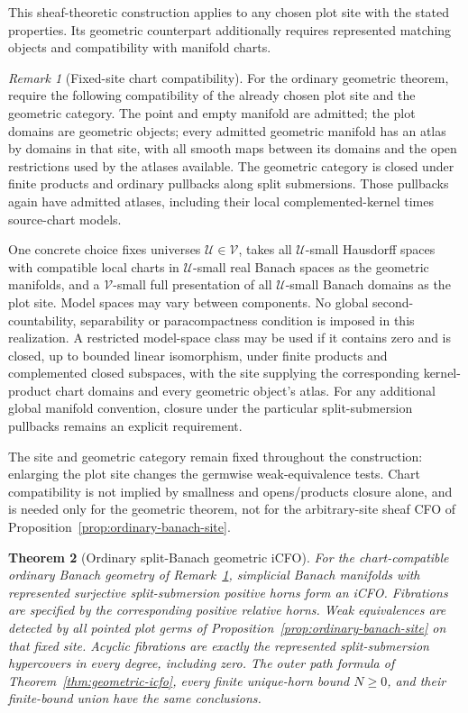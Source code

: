 \documentclass[12pt]{amsart}
\newtheorem{thm}{Theorem}[section]
\theoremstyle{definition}
\theoremstyle{remark}
\newtheorem{rem}[thm]{Remark}
\numberwithin{equation}{section}
\begin{document}
This sheaf-theoretic construction applies to any chosen
plot site with the stated properties. Its geometric
counterpart additionally requires represented matching
objects and compatibility with manifold charts.

\begin{rem}[Fixed-site chart compatibility]
\label{rem:ordinary-banach-chart-scope}
For the ordinary geometric theorem, require the following
compatibility of the already chosen plot site and the
geometric category. The point and empty manifold are admitted;
the plot domains are geometric objects; every admitted
geometric manifold has an atlas by domains in that site,
with all smooth maps between its domains and the open
restrictions used by the atlases available. The geometric
category is closed under finite products and ordinary
pullbacks along split submersions. Those pullbacks again
have admitted atlases, including their local
complemented-kernel times source-chart models.

One concrete choice fixes universes $\mathcal U\in\mathcal V$,
takes all $\mathcal U$-small Hausdorff spaces with compatible
local charts in $\mathcal U$-small real Banach spaces as the
geometric manifolds, and a $\mathcal V$-small full presentation
of all $\mathcal U$-small Banach domains as the plot site.
Model spaces may vary between components. No global
second-countability, separability or paracompactness
condition is imposed in this realization. A restricted
model-space class may be used if it contains zero and is
closed, up to bounded linear isomorphism, under finite
products and complemented closed subspaces, with the
site supplying the corresponding kernel-product chart
domains and every geometric object's atlas.
For any additional global manifold convention, closure
under the particular split-submersion pullbacks remains
an explicit requirement.

The site and geometric category remain fixed throughout
the construction: enlarging the plot site changes the
germwise weak-equivalence tests. Chart compatibility is not implied
by smallness and opens/products closure alone, and is
needed only for the geometric theorem, not for the
arbitrary-site sheaf CFO of
Proposition~\ref{prop:ordinary-banach-site}.
\end{rem}

\begin{thm}[Ordinary split-Banach geometric iCFO]
\label{thm:ordinary-banach-icfo}
For the chart-compatible ordinary Banach geometry of
Remark~\ref{rem:ordinary-banach-chart-scope}, simplicial
Banach manifolds with represented surjective split-submersion
positive horns form an iCFO. Fibrations are specified by the
corresponding positive relative horns.
Weak equivalences are detected by all pointed plot germs
of Proposition~\ref{prop:ordinary-banach-site} on that fixed
site. Acyclic fibrations are exactly the represented
split-submersion hypercovers in every degree, including zero.
The outer path formula of Theorem~\ref{thm:geometric-icfo},
every finite unique-horn bound $N\ge0$, and their finite-bound
union have the same conclusions.
\end{thm}
\end{document}
